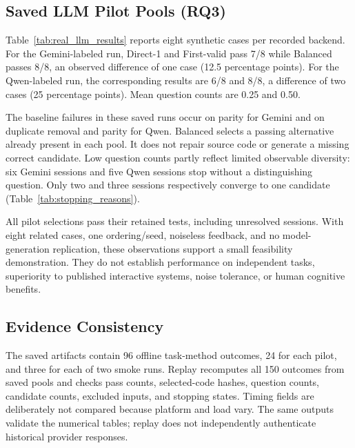 \subsection{Saved LLM Pilot Pools (RQ3)}
Table~\ref{tab:real_llm_results} reports eight synthetic cases per recorded backend. For the Gemini-labeled run, Direct-1 and First-valid pass 7/8 while Balanced passes 8/8, an observed difference of one case (12.5 percentage points). For the Qwen-labeled run, the corresponding results are 6/8 and 8/8, a difference of two cases (25 percentage points). Mean question counts are 0.25 and 0.50.


The baseline failures in these saved runs occur on parity for Gemini and on duplicate removal and parity for Qwen. Balanced selects a passing alternative already present in each pool. It does not repair source code or generate a missing correct candidate. Low question counts partly reflect limited observable diversity: six Gemini sessions and five Qwen sessions stop without a distinguishing question. Only two and three sessions respectively converge to one candidate (Table~\ref{tab:stopping_reasons}).

All pilot selections pass their retained tests, including unresolved sessions. With eight related cases, one ordering/seed, noiseless feedback, and no model-generation replication, these observations support a small feasibility demonstration. They do not establish performance on independent tasks, superiority to published interactive systems, noise tolerance, or human cognitive benefits.

\subsection{Evidence Consistency}
The saved artifacts contain 96 offline task-method outcomes, 24 for each pilot, and three for each of two smoke runs. Replay recomputes all 150 outcomes from saved pools and checks pass counts, selected-code hashes, question counts, candidate counts, excluded inputs, and stopping states. Timing fields are deliberately not compared because platform and load vary. The same outputs validate the numerical tables; replay does not independently authenticate historical provider responses.
